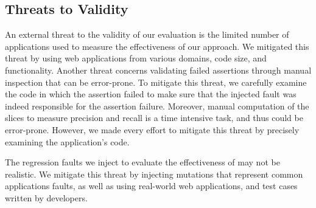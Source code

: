 \subsection{Threats to Validity} \label{Sec:threatsToValidity}
An external threat to the validity of our evaluation is the limited number of \javascript applications used to measure the effectiveness of our approach. We mitigated this threat by using web applications from various domains, code size, and functionality. Another threat concerns validating failed assertions through manual inspection that can be error-prone. To mitigate this threat, we carefully examine the code in which the assertion failed to make sure that the injected fault was indeed responsible for the assertion failure. Moreover, manual computation of the \javascript slices to measure precision and recall is a time intensive task, and thus could be error-prone. However, we made every effort to mitigate this threat by precisely examining the application's code.

The regression faults we inject to evaluate the effectiveness of \atrina may not be realistic. We mitigate this threat by injecting mutations that represent common \javascript applications faults, as well as using real-world web applications, and \selenium test cases written by developers.